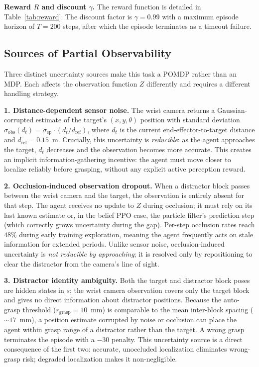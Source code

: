 \documentclass[conference]{IEEEtran}
\newcommand{\Rew}{R}
\newcommand{\ObsFn}{Z}
\newcommand{\Disc}{\gamma}
\newcommand{\sigmaobs}{\sigma_{\text{obs}}}
\newcommand{\sigmaep}{\sigma_{\text{ep}}}
\begin{document}
\textbf{Reward $\Rew$ and discount $\Disc$.}
The reward function is detailed in Table~\ref{tab:reward}.
The discount factor is $\Disc = 0.99$ with a maximum episode horizon of
$T = 200$ steps, after which the episode terminates as a timeout failure.

\subsection{Sources of Partial Observability}

Three distinct uncertainty sources make this task a POMDP rather than an MDP.
Each affects the observation function $\ObsFn$ differently and requires a
different handling strategy.

\textbf{1. Distance-dependent sensor noise.}
The wrist camera returns a Gaussian-corrupted estimate of the target's
$(x, y, \theta)$ position with standard deviation
$\sigmaobs(d_t) = \sigmaep \cdot (d_t / d_{\text{ref}})$,
where $d_t$ is the current end-effector-to-target distance and
$d_{\text{ref}} = 0.15$~m.
Crucially, this uncertainty is \emph{reducible}: as the agent approaches the
target, $d_t$ decreases and the observation becomes more accurate.
This creates an implicit information-gathering incentive: the agent must
move closer to localize reliably before grasping, without any explicit
active perception reward.

\textbf{2. Occlusion-induced observation dropout.}
When a distractor block passes between the wrist camera and the target,
the observation is entirely absent for that step.
The agent receives no update to $Z$ during occlusion; it must rely on
its last known estimate or, in the belief PPO case, the particle filter's
prediction step (which correctly grows uncertainty during the gap).
Per-step occlusion rates reach $48\%$ during early training exploration,
meaning the agent frequently acts on stale information for extended periods.
Unlike sensor noise, occlusion-induced uncertainty is \emph{not reducible
by approaching}; it is resolved only by repositioning to clear the
distractor from the camera's line of sight.

\textbf{3. Distractor identity ambiguity.}
Both the target and distractor block poses are hidden states in $s$;
the wrist camera observation covers only the target block and gives no
direct information about distractor positions.
Because the auto-grasp threshold ($r_{\text{grasp}} = 10$~mm) is comparable
to the mean inter-block spacing ($\sim\!17$~mm), a position estimate corrupted
by noise or occlusion can place the agent within grasp range of a distractor
rather than the target.
A wrong grasp terminates the episode with a $-30$ penalty.
This uncertainty source is a direct consequence of the first two: accurate,
unoccluded localization eliminates wrong-grasp risk; degraded localization
makes it non-negligible.
\end{document}
